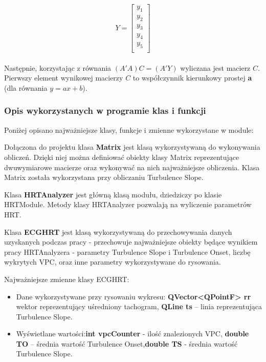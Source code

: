 \documentclass[a4paper, 11pt]{article}
\begin{document}
\begin{equation}
Y =  \left[
 \begin{array}{ccc}
   y_{1} \\
   y_{2} \\
   y_{3} \\ 
   y_{4} \\
   y_{5} \\ 
 \end{array}
\right]
\end{equation}
\\
Następnie, korzystając z równania  $(A' A)C = (A'Y)$ wyliczana jest macierz $C$.
Pierwszy element wynikowej macierzy $C$ to współczynnik kierunkowy prostej \textbf{a} (dla równania $y = ax + b$).
\subsubsection{Opis wykorzystanych w programie klas i funkcji}
\label{sec:hrt:results}

Poniżej opisano najważniejsze klasy, funkcje i zmienne wykorzystane w module:
   
Dołączona do projektu klasa \textbf{Matrix} jest klasą wykorzystywaną do wykonywania obliczeń. Dzięki niej można
definiować obiekty klasy Matrix reprezentujące dwuwymiarowe macierze oraz wykonywać na nich najważniejsze obliczenia.
Klasa Matrix została wykorzystana przy obliczaniu Turbulence Slope.

Klasa  \textbf{HRTAnalyzer} jest główną klasą modułu, dziedziczy po klasie HRTModule. Metody klasy HRTAnalyzer 
pozwalają na wyliczenie parametrów HRT.

Klasa \textbf{ECGHRT} jest klasą wykorzystywaną do przechowywania danych uzyskanych podczas pracy - przechowuje
najważniejsze obiekty będące wynikiem pracy HRTAnalyzera - parametry Turbulence Slope i Turbulence Onset, 
liczbę wykrytych VPC, oraz inne parametry wykorzystywane do rysowania.

Najważniejsze zmienne klasy ECGHRT:
\begin{itemize} 
\item Dane wykorzystywane przy rysowaniu wykresu: \textbf{QVector<QPointF> rr} wektor reprezentujący uśredniony tachogram, 
\textbf{QLine ts} -- linia reprezentująca Turbulence Slope.
\item Wyświetlane wartości:\textbf{int vpcCounter} - ilość znalezionych VPC, \textbf{double TO} --  średnia wartość Turbulence Onset,\textbf{double TS} - średnia wartość Turbulence Slope.
\end{itemize}
\end{document}

